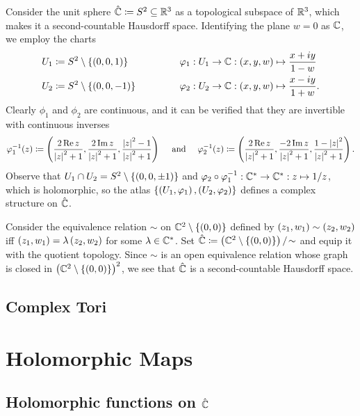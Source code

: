 \begin{example}
    Consider the unit sphere $\hat{\mathbb{C}}\coloneqq S^2\subseteq\mathbb{R}^3$ as a topological subspace of $\mathbb{R}^3$, which makes it a second-countable Hausdorff space. Identifying the plane $w=0$ as $\mathbb{C}$, we employ the charts
    \begin{equation*}
        \begin{alignedat}{2}
            U_1&\coloneqq S^2\comp\l\{\l(0,0,1\r)\r\}\ \ \ \ \ \ \ \ \ \ \ \ \ \ \ \ &&\phi_1:U_1\to\C:\tpl{x,y,w}\mapsto\frac{x+iy}{1-w} \\
            U_2&\coloneqq S^2\comp\l\{\l(0,0,-1\r)\r\}&&\phi_2:U_2\to\C:\tpl{x,y,w}\mapsto\frac{x-iy}{1+w}.
        \end{alignedat}
    \end{equation*}
    Clearly $\phi_1$ and $\phi_2$ are continuous, and it can be verified that they are invertible with continuous inverses
    \begin{equation*}
        \phi_1^{-1}\!\l(z\r)\coloneqq\tpl{\frac{2\Re z}{\l|z\r|^2+1},\frac{2\Im z}{\l|z\r|^2+1},\frac{\l|z\r|^2-1}{\l|z\r|^2+1}}\ \ \ \ \textrm{and}\ \ \ \ \phi_2^{-1}\!\l(z\r)\coloneqq\tpl{\frac{2\Re z}{\l|z\r|^2+1},\frac{-2\Im z}{\l|z\r|^2+1},\frac{1-\l|z\r|^2}{\l|z\r|^2+1}}.
    \end{equation*}
    Observe that $U_1\cap U_2=S^2\setminus\left\{\left(0,0,\pm1\right)\right\}$ and $\varphi_2\circ\varphi_1^{-1}:\mathbb{C}^\ast\to\mathbb{C}^\ast:z\mapsto1/z$, which is holomorphic, so the atlas $\left\{\left(U_1,\varphi_1\right),\left(U_2,\varphi_2\right)\right\}$ defines a complex structure on $\hat{\mathbb{C}}$.\exqed
\end{example}
\begin{example}
    Consider the equivalence relation $\sim$ on $\mathbb{C}^2\setminus\left\{\left(0,0\right)\right\}$ defined by $\left(z_1,w_1\right)\sim\left(z_2,w_2\right)$ iff $\left(z_1,w_1\right)=\lambda\left(z_2,w_2\right)$ for some $\lambda\in\mathbb{C}^\ast$. Set $\hat{\mathbb{C}}\coloneqq\left(\mathbb{C}^2\setminus\left\{\left(0,0\right)\right\}\right)/\!\sim$ and equip it with the quotient topology. Since $\sim$ is an open equivalence relation whose graph is closed in $\left(\mathbb{C}^2\setminus\left\{\left(0,0\right)\right\}\right)^2$, we see that $\hat{\mathbb{C}}$ is a second-countable Hausdorff space. \cite{tu}
\end{example}
\subsection{Complex Tori}
\section{Holomorphic Maps}
\begin{definition}\label{1:def:holomorphic_maps}

\end{definition}
\subsection{Holomorphic functions on $\hat{\mathbb{C}}$}
